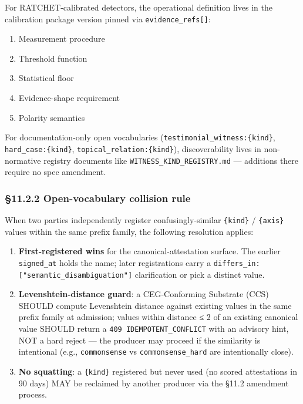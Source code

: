 \documentclass[11pt]{article}
\begin{document}
For RATCHET-calibrated detectors, the operational definition lives in the calibration package version pinned via \texttt{evidence\_refs[]}:


\begin{enumerate}\setlength\itemsep{0pt}
\item Measurement procedure
\item Threshold function
\item Statistical floor
\item Evidence-shape requirement
\item Polarity semantics
\end{enumerate}


For documentation-only open vocabularies (\texttt{testimonial\_witness:\{kind\}}, \texttt{hard\_case:\{kind\}}, \texttt{topical\_relation:\{kind\}}), discoverability lives in non-normative registry documents like \texttt{WITNESS\_KIND\_REGISTRY.md} — additions there require no spec amendment.


\subsubsection*{§11.2.2 Open-vocabulary collision rule}


When two parties independently register confusingly-similar \texttt{\{kind\}} / \texttt{\{axis\}} values within the same prefix family, the following resolution applies:


\begin{enumerate}\setlength\itemsep{0pt}
\item \textbf{First-registered wins} for the canonical-attestation surface. The earlier \texttt{signed\_at} holds the name; later registrations carry a \texttt{differs\_in: ["semantic\_disambiguation"]} clarification or pick a distinct value.
\item \textbf{Levenshtein-distance guard}: a CEG-Conforming Substrate (CCS) SHOULD compute Levenshtein distance against existing values in the same prefix family at admission; values within distance ≤ 2 of an existing canonical value SHOULD return a \texttt{409 IDEMPOTENT\_CONFLICT} with an advisory hint, NOT a hard reject — the producer may proceed if the similarity is intentional (e.g., \texttt{commonsense} vs \texttt{commonsense\_hard} are intentionally close).
\item \textbf{No squatting}: a \texttt{\{kind\}} registered but never used (no scored attestations in 90 days) MAY be reclaimed by another producer via the §11.2 amendment process.
\end{enumerate}
\end{document}
